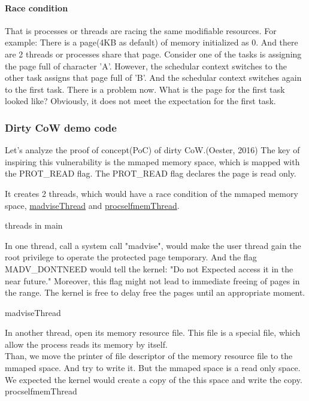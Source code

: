 \documentclass[12pt,a4paper,oneside]{IEEEconf}
\begin{document}
\paragraph{Race condition}
That is processes or threads are racing the same modifiable resources. For example:
There is a page(4KB as default) of memory initialized as 0. And there are 2 threads
or processes share that page. Consider one of the tasks is assigning the page full of
character 'A'. However, the schedular context switches to the other task assigns that
page full of 'B'. And the schedular context switches again to the first task.
There is a problem now. What is the page for the first task looked like? Obviously,
it does not meet the expectation for the first task.

\subsubsection{Dirty CoW demo code}
Let's analyze the proof of concept(PoC) of dirty CoW.(Oester, 2016)\cite{Dirty_CoW}
The key of inspiring this vulnerability is the mmaped memory space, which is mapped with
the PROT\_READ flag. The PROT\_READ flag declares the page is read only.


It creates 2 threads, which would have a race condition of the mmaped memory space,
\hyperlink{madvise}{madviseThread} and \hyperlink{procself}{procselfmemThread}.

\hypertarget{threads_main}{threads in main}


In one thread, call a system call "madvise", would make the user thread gain the root
privilege to operate the protected page temporary. And the flag MADV\_DONTNEED would
tell the kernel: "Do not Expected access it in the near future.\cite{Madvise}" Moreover,
this flag might not lead to immediate freeing of pages in the range. The kernel is free
to delay free the pages until an appropriate moment.\cite{Madvise}

\hypertarget{madvise}{madviseThread}


In another thread, open its memory resource file. This file is a special file, which allow
the process reads its memory by itself.\\
Than, we move the printer of file descriptor of the memory resource file to the mmaped
space. And try to write it. But the mmaped space is a read only space. We expected the
kernel would create a copy of the this space and write the copy\cite{root_exploit}.
\hypertarget{procself}{procselfmemThread}

\end{document}
